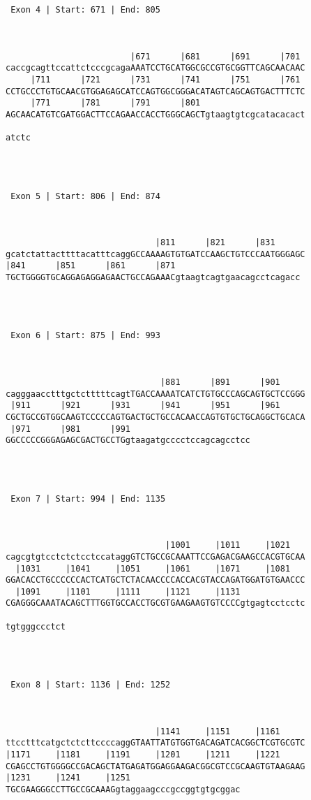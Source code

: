 \documentclass{article}
\begin{document}
\begin{Verbatim}
 Exon 4 | Start: 671 | End: 805 



                         |671      |681      |691      |701 
caccgcagttccattctcccgcagaAAATCCTGCATGGCGCCGTGCGGTTCAGCAACAAC
     |711      |721      |731      |741      |751      |761 
CCTGCCCTGTGCAACGTGGAGAGCATCCAGTGGCGGGACATAGTCAGCAGTGACTTTCTC
     |771      |781      |791      |801                     
AGCAACATGTCGATGGACTTCCAGAACCACCTGGGCAGCTgtaagtgtcgcatacacact
     
atctc




 Exon 5 | Start: 806 | End: 874 



                              |811      |821      |831      
gcatctattacttttacatttcaggGCCAAAAGTGTGATCCAAGCTGTCCCAATGGGAGC
|841      |851      |861      |871                         
TGCTGGGGTGCAGGAGAGGAGAACTGCCAGAAACgtaagtcagtgaacagcctcagacc




 Exon 6 | Start: 875 | End: 993 



                               |881      |891      |901     
cagggaacctttgctctttttcagtTGACCAAAATCATCTGTGCCCAGCAGTGCTCCGGG
 |911      |921      |931      |941      |951      |961     
CGCTGCCGTGGCAAGTCCCCCAGTGACTGCTGCCACAACCAGTGTGCTGCAGGCTGCACA
 |971      |981      |991                        
GGCCCCCGGGAGAGCGACTGCCTGgtaagatgcccctccagcagcctcc




 Exon 7 | Start: 994 | End: 1135 



                                |1001     |1011     |1021   
cagcgtgtcctctctcctccataggGTCTGCCGCAAATTCCGAGACGAAGCCACGTGCAA
  |1031     |1041     |1051     |1061     |1071     |1081   
GGACACCTGCCCCCCACTCATGCTCTACAACCCCACCACGTACCAGATGGATGTGAACCC
  |1091     |1101     |1111     |1121     |1131             
CGAGGGCAAATACAGCTTTGGTGCCACCTGCGTGAAGAAGTGTCCCCgtgagtcctcctc
            
tgtgggccctct




 Exon 8 | Start: 1136 | End: 1252 



                              |1141     |1151     |1161     
ttcctttcatgctctcttccccaggGTAATTATGTGGTGACAGATCACGGCTCGTGCGTC
|1171     |1181     |1191     |1201     |1211     |1221     
CGAGCCTGTGGGGCCGACAGCTATGAGATGGAGGAAGACGGCGTCCGCAAGTGTAAGAAG
|1231     |1241     |1251                      
TGCGAAGGGCCTTGCCGCAAAGgtaggaagcccgccggtgtgcggac





\end{Verbatim}
\end{document}
